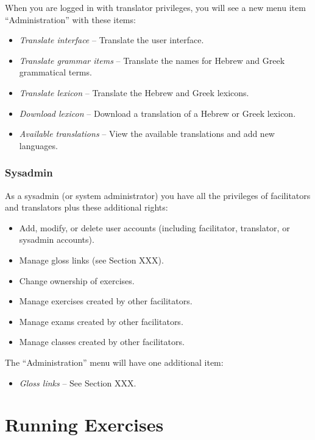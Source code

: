 \documentclass[11pt,oneside,a4paper]{memoir}
\begin{document}
When you are logged in with translator privileges, you will see a new menu item ``Administration'' with these items:

\begin{itemize}
\item \emph{Translate interface} -- Translate the user interface.
\item \emph{Translate grammar items} -- Translate the names for Hebrew and Greek grammatical terms.
\item \emph{Translate lexicon} -- Translate the Hebrew and Greek lexicons.
\item \emph{Download lexicon} -- Download a translation of a Hebrew or Greek lexicon.
\item \emph{Available translations} -- View the available translations and add new languages.
\end{itemize}

\subsection{Sysadmin}

As a sysadmin (or system administrator) you have all the privileges of facilitators and translators
plus these additional rights:

\begin{itemize}
\item Add, modify, or delete user accounts (including facilitator, translator, or sysadmin accounts).
\item Manage gloss links (see Section XXX).
\item Change ownership of exercises.
\item Manage exercises created by other facilitators.
\item Manage exams created by other facilitators.
\item Manage classes created by other facilitators.
\end{itemize}

The ``Administration'' menu will have one additional item:

\begin{itemize}
\item \emph{Gloss links} -- See Section XXX.
\end{itemize}


\chapter{Running Exercises}
\end{document}
